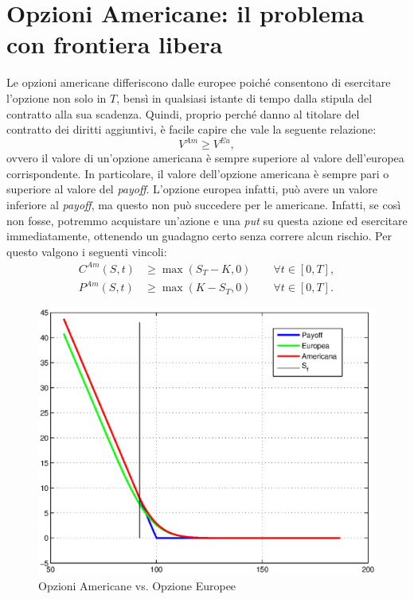 \documentclass[a4paper,10pt]{report}
\theoremstyle{plain}
\theoremstyle{definition}
\theoremstyle{remark}
\begin{document}
\section{Opzioni Americane: il problema con frontiera libera}
Le opzioni americane differiscono dalle europee poich\'e consentono di esercitare l'opzione non solo in $T$, bens\`i in qualsiasi istante di tempo dalla stipula del contratto alla sua scadenza. Quindi, proprio perch\'e danno al titolare del contratto dei diritti aggiuntivi, \`e facile capire che vale la seguente relazione: $$V^{Am}\geq V^{Eu},$$ ovvero il valore di un'opzione americana \`e sempre superiore al valore dell'europea corrispondente. In particolare, il valore dell'opzione americana \`e sempre pari o superiore al valore del \emph{payoff}. L'opzione europea infatti, pu\`o avere un valore inferiore al \emph{payoff}, ma questo non pu\`o succedere per le americane. Infatti, se cos\`i non fosse, potremmo acquistare un'azione e una \emph{put} su questa azione ed esercitare immediatamente, ottenendo un guadagno certo senza correre alcun rischio. Per questo valgono i seguenti vincoli:
\begin{align}
C^{Am}(S,t)&\geq \max(S_T-K,0)\qquad\forall t\in[0,T],\\
P^{Am}(S,t)&\geq \max(K-S_T,0)\qquad\forall t\in[0,T].
\label{putbound}
\end{align}
\begin{figure}[h!]
\begin{center}
\includegraphics[width=12cm]{img/putam.eps}
\caption{Opzioni Americane vs. Opzione Europee}
\label{putamfig}
\end{center}
\end{figure}
\end{document}
